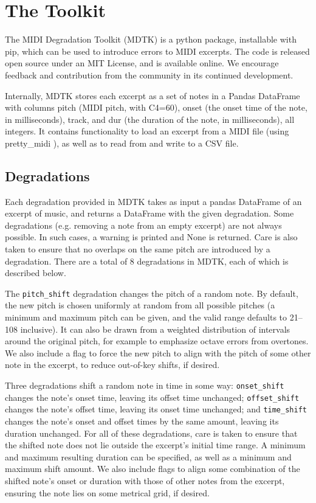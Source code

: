 \documentclass{article}
\begin{document}
\section{The Toolkit}
\label{sec:mdtk}
The MIDI Degradation Toolkit (MDTK) is a python package, installable with pip, which can be used to introduce errors to MIDI excerpts. The code is released open source under an MIT License, and is available online. We encourage feedback and contribution from the community in its continued development.

Internally, MDTK stores each excerpt as a set of notes in a Pandas \cite{pandas} DataFrame with columns pitch (MIDI pitch, with C4=60), onset (the onset time of the note, in milliseconds), track, and dur (the duration of the note, in milliseconds), all integers. It contains functionality to load an excerpt from a MIDI file (using pretty\_midi \cite{prettymidi}), as well as to read from and write to a CSV file.

\subsection{Degradations}
\label{subsec:deg}
Each degradation provided in MDTK takes as input a pandas DataFrame of an excerpt of music, and returns a DataFrame with the given degradation. Some degradations (e.g. removing a note from an empty excerpt) are not always possible. In such cases, a warning is printed and None is returned. Care is also taken to ensure that no overlaps on the same pitch are introduced by a degradation. There are a total of 8 degradations in MDTK, each of which is described below.

The \texttt{\mbox{pitch_shift}} degradation changes the pitch of a random note. By default, the new pitch is chosen uniformly at random from all possible pitches (a minimum and maximum pitch can be given, and the valid range defaults to 21--108 inclusive). It can also be drawn from a weighted distribution of intervals around the original pitch, for example to emphasize octave errors from overtones. We also include a flag to force the new pitch to align with the pitch of some other note in the excerpt, to reduce out-of-key shifts, if desired.

Three degradations shift a random note in time in some way: \texttt{\mbox{onset_shift}} changes the note's onset time, leaving its offset time unchanged; \texttt{\mbox{offset_shift}} changes the note's offset time, leaving its onset time unchanged; and \texttt{\mbox{time_shift}} changes the note's onset and offset times by the same amount, leaving its duration unchanged. For all of these degradations, care is taken to ensure that the shifted note does not lie outside the excerpt's initial time range. A minimum and maximum resulting duration can be specified, as well as a minimum and maximum shift amount. We also include flags to align some combination of the shifted note's onset or duration with those of other notes from the excerpt, ensuring the note lies on some metrical grid, if desired.
\end{document}
